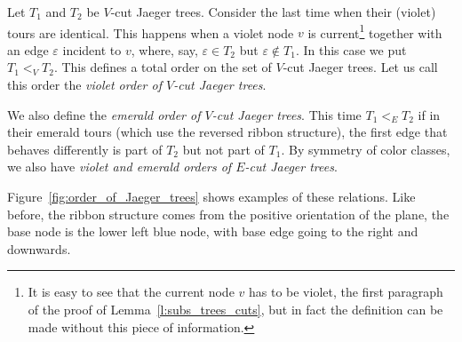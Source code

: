 \documentclass[ALCO,ThmDefs,Unicode,epreuves]{cedram}
\begin{document}
\begin{defi}
\label{def:treeorder}
Let $T_1$ and $T_2$ be $V$-cut Jaeger trees. Consider the last time when their (violet) tours are identical. This happens when a violet node $v$ is current\footnote{It is easy to see that the current node $v$ has to be violet, \cf the first paragraph of the proof of Lemma~\ref{l:subs_trees_cuts}, but in fact the definition can be made without this piece of information.} together with an edge $\varepsilon$ incident to $v$, where, say, $\varepsilon\in T_2$ but $\varepsilon\notin T_1$. In this case we put $T_1 <_V T_2$. This defines a total order on the set of $V$-cut Jaeger trees. Let us call this order the \emph{violet order of $V$-cut Jaeger trees}.

We also define the \emph{emerald order of $V$-cut Jaeger trees}. This time $T_1 <_E T_2$ if in their emerald tours (which use the reversed ribbon structure), the first edge that behaves differently is part of $T_2$ but not part of $T_1$. By symmetry of color classes, we also have \emph{violet and emerald orders of $E$-cut Jaeger trees}.
\end{defi}

Figure~\ref{fig:order_of_Jaeger_trees} shows examples of these relations. Like before, the ribbon structure comes from the positive orientation of the plane, the base node is the lower left blue node, with base edge going to the right and downwards.
\end{document}
